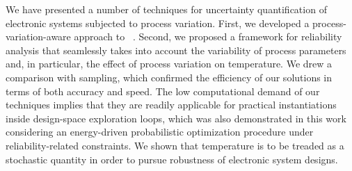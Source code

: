 We have presented a number of techniques for uncertainty quantification of electronic systems subjected to process variation.
First, we developed a process-variation-aware approach to \DSS\ \ta.
Second, we proposed a framework for reliability analysis that seamlessly takes into account the variability of process parameters and, in particular, the effect of process variation on temperature.
We drew a comparison with  sampling, which confirmed the efficiency of our solutions in terms of both accuracy and speed.
The low computational demand of our techniques implies that they are readily applicable for practical instantiations inside design-space exploration loops, which was also demonstrated in this work considering an energy-driven probabilistic optimization procedure under reliability-related constraints.
We shown that temperature is to be treaded as a stochastic quantity in order to pursue robustness of electronic system designs.
